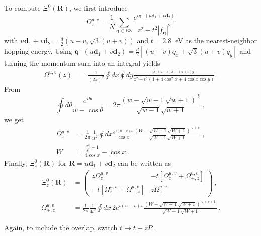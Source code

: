\documentclass[aps, prb, superscriptaddress, preprint, floatfix]{revtex4-1}
\begin{document}
To compute $\Xi_z^0(\mathbf{R})$, we first introduce
%
\begin{equation}
	\Omega^{u,v}_z =
	\frac{1}{N}\sum_{\mathbf{q}\in\mathrm{BZ}}
	\frac{
		e^{i\mathbf{q}\cdot \left(u\mathbf{d}_1 + v\mathbf{d}_2\right)}
	}
	{z^2 - t^2\left| f_{\mathbf{q}}\right|^2}
	\label{eqn:Omega_R}
\end{equation}
%
with $ u\mathbf{d}_1 + v\mathbf{d}_2 = \frac{d}{2}\left(u - v, \sqrt{3}\left(u+v\right)\right)$ and $t = 2.8$~eV as the nearest-neighbor hopping energy. Using $\mathbf{q}\cdot \left(u\mathbf{d}_1 + v\mathbf{d}_2\right)  = \frac{d}{2}\left[\left(u - v\right)q_x + \sqrt{3}\left(u+v\right)q_y\right]$ and turning the momentum sum into an integral yields
%
\begin{align}
	\Omega^{u,v}\left(z\right) 
	& = \frac{1}{\left(2\pi\right)^2}\oint dx \oint dy
	\frac
	{e^{i \left[\left(u - v\right)x + \left(u+v\right)y\right]}}
	{z^2 - t^2\left(1 + 4\cos^2 x + 4 \cos x\cos y \right)}\,.
	\label{eqn:Omega_R_2}
\end{align}
%
From
%
\begin{equation}
	\oint d\theta \frac{e^{il\theta}}{w-\cos\theta} = 2\pi \frac{\left(w - \sqrt{w - 1}\sqrt{w + 1}\right)^{|l|}}{\sqrt{w - 1}\sqrt{w + 1}}\,,
	\label{eqn:Ang_Int}
\end{equation}
%
we get
%
\begin{align}
	\Omega^{u,v}_z &= \frac{1}{2\pi}\frac{1}{4t^2}
	\oint dx \frac{e^{i\left(u - v\right)x}}{\cos x}\frac{\left(W - \sqrt{W - 1}\sqrt{W + 1}\right)^{|u+v|}}{\sqrt{W - 1}\sqrt{W + 1}}\,,
	\label{eqn:Omega_R_3}
	\\
	W &= \frac{\frac{z^2}{t^2}-1}{4\cos x}-\cos x\,.
	\label{eqn:W}
\end{align}
%
Finally, $\Xi^0_z({\mathbf{R}})$ for $\mathbf{R} = u\mathbf{d}_1 + v\mathbf{d}_2$ can be written as
%
\begin{align}
	\Xi^0_z({\mathbf{R}}) 
	&=
	\begin{pmatrix}
		z\Omega^{u,v}_z
		&
		- t\left[\Omega^{u,v}_z + \Omega^{u,v}_{+,z} \right]
		\\
		- t\left[\Omega^{u,v}_z + \Omega^{u,v}_{-,z}\right]
		&
		z\Omega^{u,v}_z
	\end{pmatrix}\,,
	\\
	\Omega^{u,v}_{\pm,z}
	&= 
	 \frac{1}{2\pi}\frac{1}{4t^2}
	\oint dx \,2e^{i\left(u - v\right)x}\frac{\left(W - \sqrt{W - 1}\sqrt{W + 1}\right)^{|u+v\pm 1|}}{\sqrt{W - 1}\sqrt{W + 1}}
\,.
\end{align}
%

Again, to include the overlap, switch $t\rightarrow t+ zP$.
\end{document}
